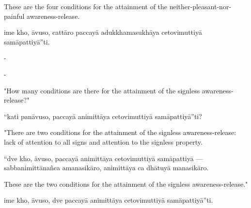 \begin{samepage}
\begin{leftcolumn*}
These are the four conditions for the attainment of the neither-pleasant-nor-painful awareness-release.
\end{leftcolumn*}

\begin{rightcolumn}
ime kho, āvuso, cattāro paccayā adukkhamasukhāya cetovimuttiyā samāpattiyā”ti.
\end{rightcolumn}
\end{samepage}

\begin{samepage}
\begin{leftcolumn*}
-
\end{leftcolumn*}

\begin{rightcolumn}
-
\end{rightcolumn}
\end{samepage}

\begin{samepage}
\begin{leftcolumn*}
"How many conditions are there for the attainment of the signless awareness-release?"
\end{leftcolumn*}

\begin{rightcolumn}
“kati panāvuso, paccayā animittāya cetovimuttiyā samāpattiyā”ti?
\end{rightcolumn}
\end{samepage}

\begin{samepage}
\begin{leftcolumn*}
"There are two conditions for the attainment of the signless awareness-release: lack of attention to all signs and attention to the signless property.
\end{leftcolumn*}

\begin{rightcolumn}
“dve kho, āvuso, paccayā animittāya cetovimuttiyā samāpattiyā — sabbanimittānañca amanasikāro, animittāya ca dhātuyā manasikāro.
\end{rightcolumn}
\end{samepage}

\begin{samepage}
\begin{leftcolumn*}
These are the two conditions for the attainment of the signless awareness-release."
\end{leftcolumn*}

\begin{rightcolumn}
ime kho, āvuso, dve paccayā animittāya cetovimuttiyā samāpattiyā”ti.
\end{rightcolumn}
\end{samepage}

